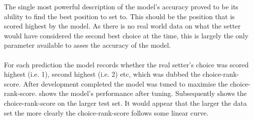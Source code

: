 \documentclass[main.tex]{subfiles}
\begin{document}
        The single most powerful description of the model's accuracy proved to be its ability to find the best position to set to. This should be the position that is scored highest by the model. As there is no real world data on what the setter would have considered the second best choice at the time, this is largely the only parameter available to asses the accuracy of the model.
        \\\\
        For each prediction the model records whether the real setter's choice was scored highest (i.e. 1), second highest (i.e. 2) etc,  which was dubbed the choice-rank-score. After development completed the model was tuned to maximise the choice-rank-score.  shows the model's performance after tuning. Subsequently  shows the choice-rank-score on the larger test set. It would appear that the larger the data set the more clearly the choice-rank-score follows some linear curve.
        \\\\
\end{document}
